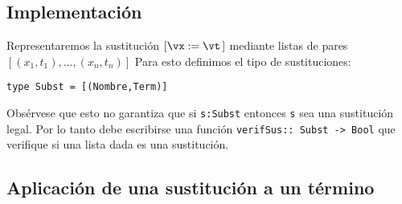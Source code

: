 \documentclass[11pt,letterpaper]{article}
\begin{document}


\subsection{Implementación}
Representaremos la sustitución $[\vx:=\vt\,]$ mediante listas de pares
$ [(x_1,t_1),\ldots,(x_n,t_n)] $
Para esto definimos el tipo de sustituciones:
\begin{verbatim}
type Subst = [(Nombre,Term)]
\end{verbatim}
Obsérvese que esto no garantiza que si \verb=s:Subst= entonces \verb-s- sea una 
sustitución legal. Por lo tanto debe escribirse una función 
\verb=verifSus:: Subst -> Bool= que verifique si una lista dada es una 
sustitución.


\subsection{Aplicación de una sustitución a un término}
\end{document}
